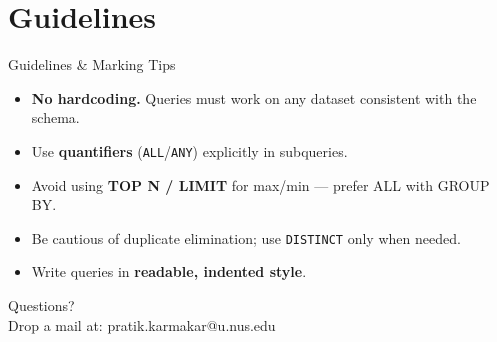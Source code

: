 \documentclass{beamer}
\begin{document}
\section{Guidelines}
\begin{frame}{Guidelines \& Marking Tips}
\small
\begin{itemize}\itemsep4pt
  \item \textbf{No hardcoding.} Queries must work on any dataset consistent with the schema.
  \item Use \textbf{quantifiers} (\texttt{ALL}/\texttt{ANY}) explicitly in subqueries.
  \item Avoid using \textbf{TOP N / LIMIT} for max/min — prefer ALL with GROUP BY.
  \item Be cautious of duplicate elimination; use \texttt{DISTINCT} only when needed.
  \item Write queries in \textbf{readable, indented style}.
\end{itemize}
\end{frame}

\begin{frame}
\begin{center}
Questions?\\
Drop a mail at: pratik.karmakar@u.nus.edu
\end{center}
\end{frame}
\end{document}

